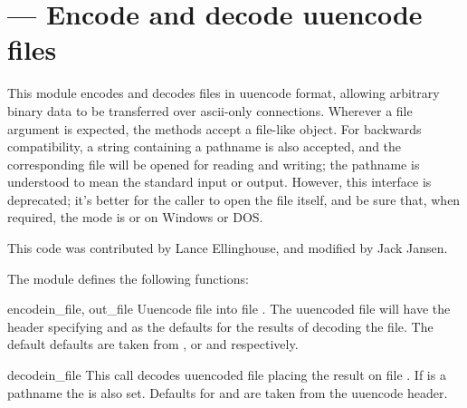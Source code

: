 \section{ ---
         Encode and decode uuencode files}



This module encodes and decodes files in uuencode format, allowing
arbitrary binary data to be transferred over ascii-only connections.
Wherever a file argument is expected, the methods accept a file-like
object.  For backwards compatibility, a string containing a pathname
is also accepted, and the corresponding file will be opened for
reading and writing; the pathname  is understood to mean the
standard input or output.  However, this interface is deprecated; it's
better for the caller to open the file itself, and be sure that, when
required, the mode is  or  on Windows or DOS.

This code was contributed by Lance Ellinghouse, and modified by Jack
Jansen.

The  module defines the following functions:

\begin{funcdesc}{encode}{in_file, out_file}
Uuencode file  into file .  The uuencoded
file will have the header specifying  and  as the
defaults for the results of decoding the file. The default defaults
are taken from , or  and 
respectively. 
\end{funcdesc}

\begin{funcdesc}{decode}{in_file}
This call decodes uuencoded file  placing the result on
file . If  is a pathname the  is
also set. Defaults for  and  are taken from
the uuencode header.
\end{funcdesc}
